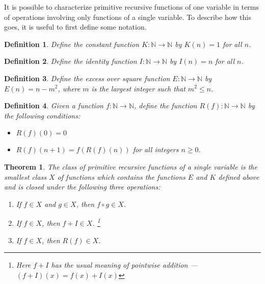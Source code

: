 \documentclass[12pt]{article}
\newtheorem{theorem}{Theorem}
\newtheorem{definition}{Definition}
\begin{document}
It is possible to characterize primitive recursive functions of one
variable in terms of operations involving only functions of a single
variable.  To describe how this goes, it is useful to first define
some notation.

\begin{definition}
Define the constant function $K \colon 
\mathbb{N} \to \mathbb{N}$ by $K(n) = 1$ for all $n$.  
\end{definition}

\begin{definition}
Define the identity function $I \colon 
\mathbb{N} \to \mathbb{N}$ by $I(n) = n$ for all $n$.  
\end{definition}

\begin{definition}
Define the excess over square function 
$E \colon \mathbb{N} \to \mathbb{N}$ by 
$E(n) = n - m^2$, where $m$ is the largest integer such that
$m^2 \le n$. 
\end{definition}

\begin{definition}
Given a function $f \colon \mathbb{N} \to \mathbb{N}$, define
the function $R(f) \colon \mathbb{N} \to \mathbb{N}$ by the
following conditions:
\begin{itemize}
\item $R(f)(0) = 0$
\item $R(f)(n+1) = f(R(f)(n))$ for all integers $n \ge 0$.
\end{itemize}
\end{definition}

\begin{theorem}
The class of primitive recursive functions of a single variable is
the smallest class $X$ of functions which contains the functions 
$E$ and $K$ defined above and is closed under the following
three operations:
\begin{enumerate}
\item If $f \in X$ and $g \in X$, then $f \circ g \in X$.
\item If $f \in X$, then $f + I \in X$.
\footnote{Here $f + I$ has the usual meaning of pointwise addition ---
$(f + I)(x) = f(x) + I(x)$}
\item If $f \in X$, then $R(f) \in X$.
\end{enumerate}
\end{theorem}
\end{document}
